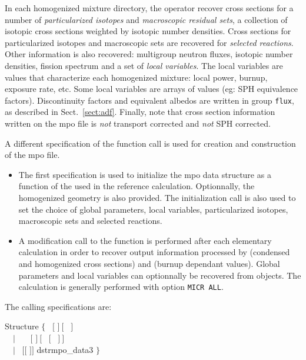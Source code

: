 In each homogenized mixture directory, the  operator recover
cross sections for a number of {\sl particularized isotopes} and {\sl macroscopic
residual sets}, a collection of isotopic cross sections weighted by isotopic number densities.
Cross sections for particularized isotopes and macroscopic sets are recovered for
{\sl selected reactions}. Other information is also recovered: multigroup neutron
fluxes, isotopic number densities, fission spectrum and a set
of {\sl local variables}. The local variables are values that characterize each
homogenized mixture: local power, burnup, exposure rate, etc. Some local variables
are arrays of values (eg: SPH equivalence factors). Discontinuity factors and equivalent albedos
are written in group {\tt flux}, as described in Sect.~\ref{sect:adf}. Finally, note that cross section
information written on the {\sc mpo} file is {\sl not} transport corrected and {\sl not}
SPH corrected.

\vskip 0.1cm

A different specification of the  function call is used for
creation and construction of the {\sc mpo} file.
\begin{itemize}
\item The first specification is used to initialize the {\sc mpo} data structure
as a function of the  used in the reference calculation. Optionnally,
the homogenized geometry is also provided. The initialization call is also used to
set the choice of global parameters, local variables, particularized isotopes,
macroscopic sets and selected reactions.
\item A modification call to the  function is performed after each
elementary calculation in order to recover output information processed by 
(condensed and homogenized cross sections) and  (burnup dependant values).
Global parameters and local variables can optionnally be recovered from 
objects. The  calculation is generally performed with option {\tt MICR ALL}.
\end{itemize}

The calling specifications are:

\vskip -0.5cm

\begin{DataStructure}{Structure }
$\{$~ \moc{:=}  $[$  $]~[$~ $]$ \moc{::}  \\
~~$|$~ \moc{:=}  ~~$[$  $]~[$ ~$[$~ $]~]$ \moc{::}  \\
~~$|$~ \moc{:=}   $[[$  $]]$ \moc{::} dstr{mpo\_data3} $\}$ \\
\end{DataStructure}


